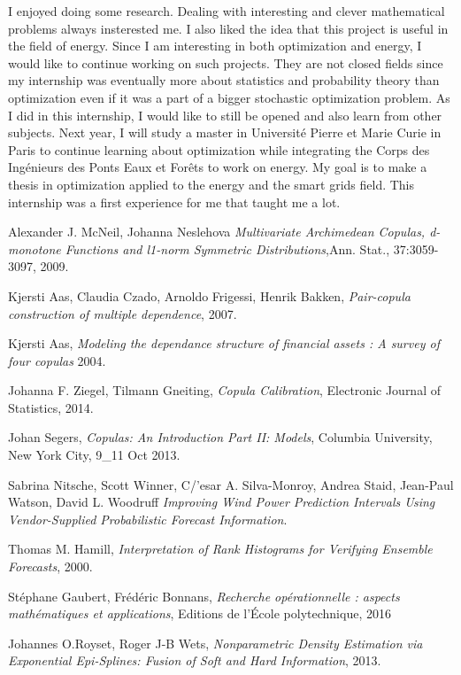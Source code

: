\documentclass{article}
\begin{document}
	I enjoyed doing some research. Dealing with interesting and clever mathematical problems always insterested me. I also liked the idea that this project is useful in the field of energy. Since I am interesting in both optimization and energy, I would like to continue working on such projects. They are not closed fields since my internship was eventually more about statistics and probability theory than optimization even if it was a part of a bigger stochastic optimization problem. As I did in this internship, I would like to still be opened and also learn from other subjects. Next year, I will study a master in Universit\'e Pierre et Marie Curie in Paris to continue learning about optimization while integrating the Corps des Ing\'enieurs des Ponts Eaux et For\^ets to work on energy. My goal is to make a thesis in optimization applied to the energy and the smart grids field. This internship was a first experience for me that taught me a lot.



\newpage
\begin{thebibliography}{9}

  	Alexander J. McNeil, Johanna Neslehova
 	 \emph{Multivariate Archimedean Copulas, d-monotone Functions and l1-norm Symmetric Distributions},Ann. Stat., 37:3059-3097, 2009.	

  	Kjersti Aas, Claudia Czado, Arnoldo Frigessi, Henrik Bakken,
 	 \emph{Pair-copula construction of multiple dependence},
  	2007.
  	
  	Kjersti Aas,
 	 \emph{Modeling the dependance structure of financial assets : A survey of four copulas}
  	2004.
  	
  	Johanna F. Ziegel, Tilmann Gneiting, 
 	 \emph{Copula Calibration}, Electronic Journal of Statistics,
  	2014.
  	
  	Johan Segers, 
 	 \emph{Copulas: An Introduction
Part II: Models}, Columbia University, New York City,
  	9\_11 Oct 2013.

  	Sabrina Nitsche, Scott Winner, C/'esar A. Silva-Monroy, Andrea Staid, Jean-Paul Watson, David L. Woodruff
 	 \emph{Improving Wind Power Prediction Intervals Using
Vendor-Supplied Probabilistic Forecast Information}.	
	
  	Thomas M. Hamill,
 	 \emph{Interpretation of Rank Histograms for Verifying Ensemble Forecasts},
  	2000.  	
  	
  	Stéphane Gaubert, Frédéric Bonnans,
  	\emph{Recherche opérationnelle : aspects mathématiques et applications},
  	Editions de l'École polytechnique,
  	2016	

	Johannes O.Royset, Roger J-B Wets,
	\emph{Nonparametric Density Estimation via Exponential Epi-Splines: Fusion of Soft and Hard Information}, 2013.	
	
	\end{thebibliography}
\end{document}
